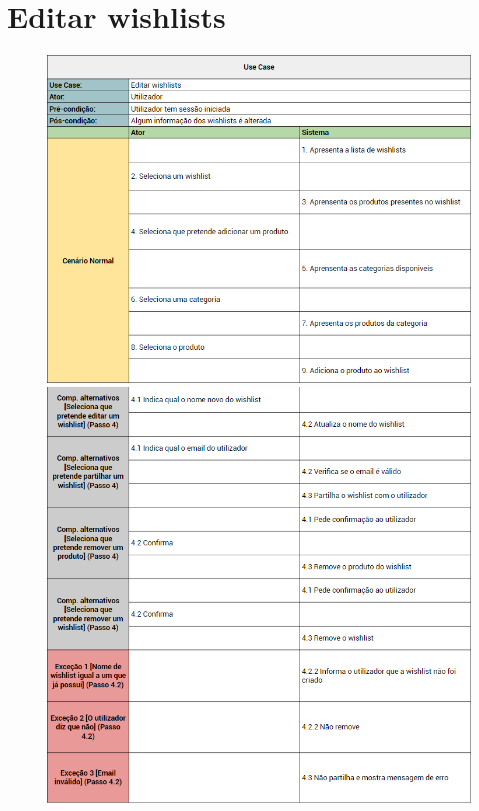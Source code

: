 \documentclass[a4paper]{report}
\begin{document}
    \section{Editar wishlists}
        \begin{figure}[H]
        \centering
            \includegraphics[width=\textwidth]{images/usecases/editar_whishlist_1.png}
            \includegraphics[width=\textwidth]{images/usecases/editar_whishlist_2.png}
        \end{figure}
\end{document}

